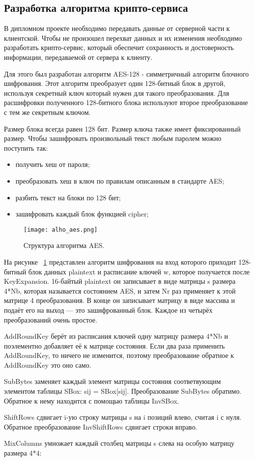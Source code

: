 \subsection{Разработка алгоритма крипто-сервиса }
\label{sub:arch_and_mod:alholib-crypto}

В дипломном проекте необходимо передавать данные от серверной части к клиентской. Чтобы не произошел перехват данных и их изменения необходимо разработать крипто-сервис, который обеспечит сохранность и достоверность информации, передаваемой от сервера к клиенту.

Для этого был разработан алгоритм AES-128 - симметричный алгоритм блочного шифрования. Этот алгоритм преобразует один 128-битный блок в другой, используя секретный ключ который нужен для такого преобразования. Для расшифровки полученного 128-битного блока используют второе преобразование с тем же секретным ключом.

Размер блока всегда равен 128 бит. Размер ключа также имеет фиксированный размер. Чтобы зашифровать произвольный текст любым паролем можно поступить так: 

\begin{itemize}
  \item получить хеш от пароля;
  \item преобразовать хеш в ключ по правилам описанным в стандарте AES;
  \item разбить текст на блоки по 128 бит;
  \item зашифровать каждый блок функцией cipher;
\end{itemize}
\begin{figure}[ht]
\centering
  \texttt{[image: alho\_aes.png]}  
  \caption{ Структура алгоритма AES. }
  \label{fig:domain:manual_structure:structural_aes}
\end{figure}
На рисунке ~\ref{fig:domain:manual_structure:structural_aes} представлен алгоритм шифрования на вход которого приходит 128-битный блок данных plaintext и расписание ключей w, которое получается после KeyExpansion. 16-байтый plaintext он записывает в виде матрицы s размера 4*Nb, которая называется состоянием AES, и затем Nr раз применяет к этой матрице 4 преобразования. В конце он записывает матрицу в виде массива и подаёт его на выход — это зашифрованный блок. Каждое из четырёх преобразований очень простое.

AddRoundKey берёт из расписания ключей одну матрицу размера 4*Nb и поэлементно добавляет её к матрице состояния. Если два раза применить AddRoundKey, то ничего не изменится, поэтому преобразование обратное к AddRoundKey это оно само.

SubBytes заменяет каждый элемент матрицы состояния соответвующим элементом таблицы SBox: sij = SBox[sij]. Преобразование SubBytes обратимо. Обратное к нему находится с помощью таблицы InvSBox.

ShiftRows сдвигает i-ую строку матрицы s на i позиций влево, считая i с нуля. Обратное преобразование InvShiftRows сдвигает строки вправо.

MixColumns умножает каждый столбец матрицы s слева на особую матрицу размера 4*4:
